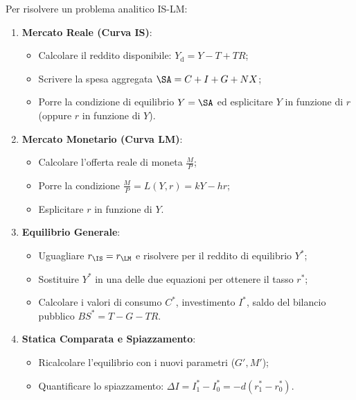 \begin{metodo}
Per risolvere un problema analitico IS-LM:
\begin{enumerate}
    \item \textbf{Mercato Reale (Curva IS)}:
    \begin{itemize}
        \item Calcolare il reddito disponibile: $Y_{\mathrm{d}} = Y - T + TR$;
        \item Scrivere la spesa aggregata $\SA = C + I + G + NX$;
        \item Porre la condizione di equilibrio $Y = \SA$ ed esplicitare $Y$ in funzione di $r$ (oppure $r$ in funzione di $Y$).
    \end{itemize}
    \item \textbf{Mercato Monetario (Curva LM)}:
    \begin{itemize}
        \item Calcolare l'offerta reale di moneta $\frac{M}{P}$;
        \item Porre la condizione $\frac{M}{P} = L(Y, r) = kY - hr$;
        \item Esplicitare $r$ in funzione di $Y$.
    \end{itemize}
    \item \textbf{Equilibrio Generale}:
    \begin{itemize}
        \item Uguagliare $r_{\IS} = r_{\LM}$ e risolvere per il reddito di equilibrio $Y^*$;
        \item Sostituire $Y^*$ in una delle due equazioni per ottenere il tasso $r^*$;
        \item Calcolare i valori di consumo $C^*$, investimento $I^*$, saldo del bilancio pubblico $BS^* = T - G - TR$.
    \end{itemize}
    \item \textbf{Statica Comparata e Spiazzamento}:
    \begin{itemize}
        \item Ricalcolare l'equilibrio con i nuovi parametri ($G', M'$);
        \item Quantificare lo spiazzamento: $\Delta I = I_1^* - I_0^* = -d (r_1^* - r_0^*)$.
    \end{itemize}
\end{enumerate}
\end{metodo}

